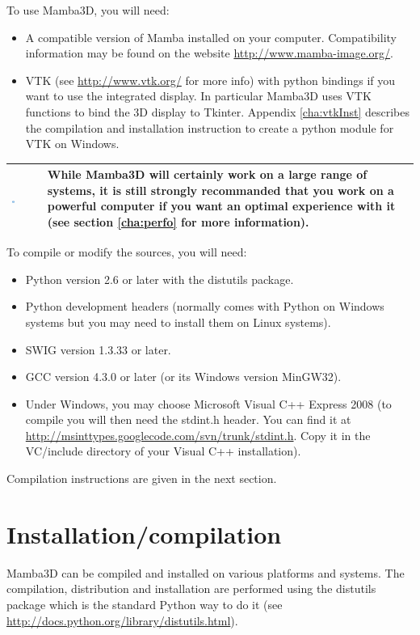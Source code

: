 \documentclass[a4paper,10pt,oneside]{article}
\newenvironment{tipBox}
{
    \begin{center}
    \begin{tabular}{ | b{0.1\textwidth} b{0.8\textwidth} | }
    \hline
    \rowcolor{lightblue}
    \includegraphics[width=0.1\textwidth]{Crystal_Clear_action_info.png} &
}
{
    \\
    \hline
    \end{tabular}
    \end{center}
}
\begin{document}
To use Mamba3D, you will need:
\begin{itemize}
\item A compatible version of Mamba installed on your computer. Compatibility
information may be found on the website \url{http://www.mamba-image.org/}.
\item VTK (see \url{http://www.vtk.org/} for more info) with python bindings
if you want to use the integrated display. In particular Mamba3D uses VTK
functions to bind the 3D display to Tkinter. Appendix \ref{cha:vtkInst}
describes the compilation and installation instruction to create a python
module for VTK on Windows.
\end{itemize}

\begin{tipBox}
While Mamba3D will certainly work on a large range of systems, it is still
strongly recommanded that you work on a powerful computer if you want an
optimal experience with it (see section \ref{cha:perfo} for more information).
\end{tipBox}

To compile or modify the sources, you will need:
\begin{itemize}
\item Python version 2.6 or later with the distutils package.
\item Python development headers (normally comes with Python on Windows systems 
but you may need to install them on Linux systems).
\item SWIG version 1.3.33 or later.
\item GCC version 4.3.0 or later (or its Windows version MinGW32).
\item  Under Windows, you may choose Microsoft Visual C++ Express 2008 (to 
compile you will then need the stdint.h header. You can find it at 
\url{http://msinttypes.googlecode.com/svn/trunk/stdint.h}. Copy it in the VC/include 
directory of your Visual C++ installation).
\end{itemize}
Compilation instructions are given in the next section.

\pagebreak

\section{Installation/compilation}
\label{cha:Inst}

Mamba3D can be compiled and installed on various platforms and systems.
The compilation, distribution and installation are performed using the
distutils package which is the standard Python way to do it
(see \url{http://docs.python.org/library/distutils.html}).
\end{document}
